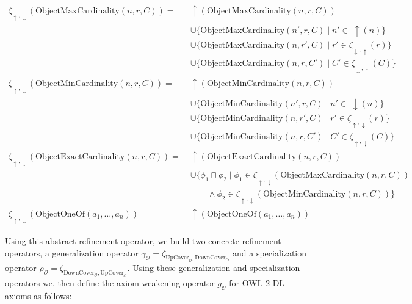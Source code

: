\begin{align*}
    \zeta_{\uparrow, \downarrow}(\mathrm{ObjectMaxCardinality}(n, r, C)) = \;& \uparrow (\mathrm{ObjectMaxCardinality}(n, r, C)) \\&  \cup \{\mathrm{ObjectMaxCardinality}(n', r, C) \mid n' \in \; \uparrow (n)\} \\&   \cup \{\mathrm{ObjectMaxCardinality}(n, r', C) \mid r' \in \zeta_{\downarrow, \uparrow}(r)\} \\&  \cup \{\mathrm{ObjectMaxCardinality}(n, r, C') \mid C' \in \zeta_{\downarrow, \uparrow} (C)\} \\
    \zeta_{\uparrow, \downarrow}(\mathrm{ObjectMinCardinality}(n, r, C)) = \;& \uparrow (\mathrm{ObjectMinCardinality}(n, r, C)) \\& \cup \{\mathrm{ObjectMinCardinality}(n', r, C) \mid n' \in \; \downarrow (n)\} \\& \cup \{\mathrm{ObjectMinCardinality}(n, r', C) \mid r' \in \zeta_{\uparrow, \downarrow}(r)\} \\& \cup \{\mathrm{ObjectMinCardinality}(n, r, C') \mid C' \in \zeta_{\uparrow, \downarrow} (C)\} \\
    \zeta_{\uparrow, \downarrow}(\mathrm{ObjectExactCardinality}(n, r, C)) = \;& \uparrow (\mathrm{ObjectExactCardinality}(n, r, C)) \\& \cup \{ \phi_1 \sqcap \phi_2   \mid \phi_1 \in \zeta_{\uparrow, \downarrow} (\mathrm{ObjectMaxCardinality}(n, r, C)) \\ \;& \qquad \land \phi_2 \in \zeta_{\uparrow, \downarrow} (\mathrm{ObjectMinCardinality}(n, r, C)) \} \\
    \zeta_{\uparrow, \downarrow}(\mathrm{ObjectOneOf}(a_1, \dots, a_n)) = \;& \uparrow (\mathrm{ObjectOneOf}(a_1, \dots, a_n))
\end{align*}
\endgroup

Using this abstract refinement operator, we build two concrete refinement operators, a generalization operator $\gamma_\mathcal{O} = \zeta_{\mathrm{UpCover}_\mathcal{O}, \mathrm{DownCover}_\mathrm{O}}$ and a specialization operator $\rho_\mathcal{O} = \zeta_{\mathrm{DownCover}_\mathcal{O}, \mathrm{UpCover}_\mathcal{O}}$. Using these generalization and specialization operators we, then define the axiom weakening operator $g_\mathcal{O}$ for OWL 2 DL axioms as follows:

